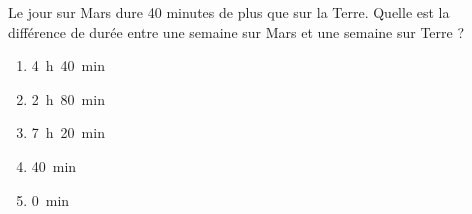 Le jour sur Mars dure 40 minutes de plus que sur la Terre. Quelle est
la différence de durée entre une semaine sur Mars et une semaine sur
Terre ?
\begin{multicols}{5}
  \begin{enumerate}[A/]
  \item 4~h~40~min
  \item 2~h~80~min
  \item 7~h~20~min
  \item 40~min
  \item 0~min
  \end{enumerate}
\end{multicols}